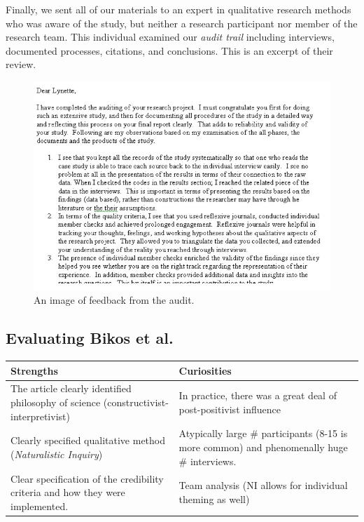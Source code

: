 \documentclass[
  english,
]{book}
\begin{document}
Finally, we sent all of our materials to an expert in qualitative research methods who was aware of the study, but neither a research participant nor member of the research team. This individual examined our \emph{audit trail} including interviews, documented processes, citations, and conclusions. This is an excerpt of their review.

\begin{figure}
\centering
\includegraphics{images/Qualitative/audit.jpg}
\caption{An image of feedback from the audit.}
\end{figure}

\hypertarget{evaluating-bikos-et-al.--bikos_longitudinal_2007}{%
\subsection{\texorpdfstring{Evaluating Bikos et al. \citeyearpar{bikos_longitudinal_2007}}{Evaluating Bikos et al. {[}-@bikos\_longitudinal\_2007{]}}}\label{evaluating-bikos-et-al.--bikos_longitudinal_2007}}

\begin{longtable}[]{@{}
  >{\raggedright\arraybackslash}p{}
  >{\raggedright\arraybackslash}p{}@{}}
\toprule
Strengths & Curiosities \\
\midrule
\endhead
The article clearly identified philosophy of science (constructivist-interpretivist) & In practice, there was a great deal of post-positivist influence \\
Clearly specified qualitative method (\emph{Naturalistic Inquiry}) & Atypically large \# participants (8-15 is more common) and phenomenally huge \# interviews. \\
Clear specification of the credibility criteria and how they were implemented. & Team analysis (NI allows for individual theming as well) \\
\bottomrule
\end{longtable}
\end{document}
